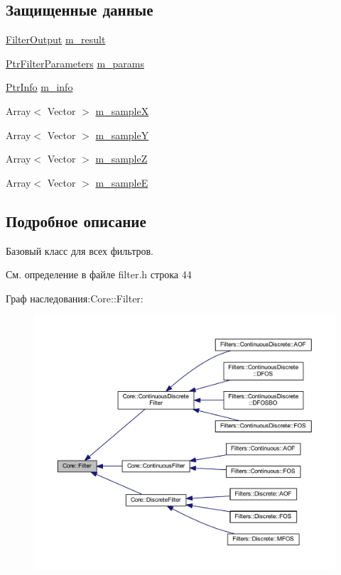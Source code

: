 \subsection*{Защищенные данные}
\begin{DoxyCompactItemize}
\item 
\hyperlink{namespace_core_a60877581a235fc9566087b54d463ce9c}{Filter\+Output} \hyperlink{class_core_1_1_filter_a1ae638614492df7edeaa2db4f528ad65}{m\+\_\+result}
\item 
\hyperlink{namespace_core_a4811af8148ba137d644b9a61a042cf03}{Ptr\+Filter\+Parameters} \hyperlink{class_core_1_1_filter_ae4d42bb0f0e6299d4edbfc310e96d09f}{m\+\_\+params}
\item 
\hyperlink{namespace_core_a647483da8a1266d5bbd3e9bb5cd66d08}{Ptr\+Info} \hyperlink{class_core_1_1_filter_a089304c3d1695bd6b47d5bfd8fcfb574}{m\+\_\+info}
\item 
Array$<$ Vector $>$ \hyperlink{class_core_1_1_filter_abed73a8bfce99d24418f6dee90c44333}{m\+\_\+sampleX}
\item 
Array$<$ Vector $>$ \hyperlink{class_core_1_1_filter_a3e2e475b650504bb7c800e3f27364580}{m\+\_\+sampleY}
\item 
Array$<$ Vector $>$ \hyperlink{class_core_1_1_filter_af0e905e89bc5db8e07f283b68fb57a60}{m\+\_\+sampleZ}
\item 
Array$<$ Vector $>$ \hyperlink{class_core_1_1_filter_acab6dcadb8caf8f05cb2beeb1deafd74}{m\+\_\+sampleE}
\end{DoxyCompactItemize}


\subsection{Подробное описание}
Базовый класс для всех фильтров. 

См. определение в файле filter.\+h строка 44



Граф наследования\+:Core\+:\+:Filter\+:\nopagebreak
\begin{figure}[H]
\begin{center}
\leavevmode
\includegraphics[width=350pt]{class_core_1_1_filter__inherit__graph}
\end{center}
\end{figure}


